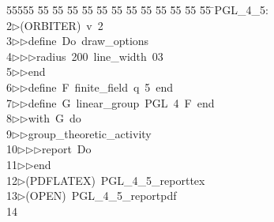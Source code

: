 %
%
\begin{tabbing}
55555 \= 55 \= 55 \= 55 \= 55 \= 55 \= 55 \= 55 \= 55 \= 55 \= 55 \= 55 \= 55 \= \>PGL\_4\_5:\\[0pt]
2\>$\triangleright$\>(ORBITER)\ v\ 2\ \\[0pt]
3\>$\triangleright$\>$\triangleright$\>define\ Do\ draw\_options\ \\[0pt]
4\>$\triangleright$\>$\triangleright$\>$\triangleright$\>radius\ 200\ line\_width\ 03\ \\[0pt]
5\>$\triangleright$\>$\triangleright$\>end\ \\[0pt]
6\>$\triangleright$\>$\triangleright$\>define\ F\ finite\_field\ q\ 5\ end\ \\[0pt]
7\>$\triangleright$\>$\triangleright$\>define\ G\ linear\_group\ PGL\ 4\ F\ end\ \\[0pt]
8\>$\triangleright$\>$\triangleright$\>with\ G\ do\ \\[0pt]
9\>$\triangleright$\>$\triangleright$\>group\_theoretic\_activity\ \\[0pt]
10\>$\triangleright$\>$\triangleright$\>$\triangleright$\>report\ Do\ \\[0pt]
11\>$\triangleright$\>$\triangleright$\>end\\[0pt]
12\>$\triangleright$\>(PDFLATEX)\ PGL\_4\_5\_reporttex\\[0pt]
13\>$\triangleright$\>(OPEN)\ PGL\_4\_5\_reportpdf\\[0pt]
14\>\end{tabbing}

